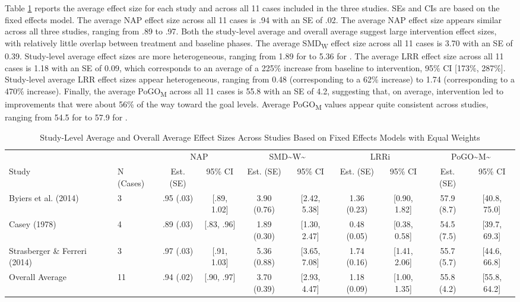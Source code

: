 \documentclass[
]{book}
\begin{document}
Table \ref{tab:FE-study-avg} reports the average effect size for each study and across all 11 cases included in the three studies. SEs and CIs are based on the fixed effects model. The average NAP effect size across all 11 cases is .94 with an SE of .02. The average NAP effect size appears similar across all three studies, ranging from .89 to .97. Both the study-level average and overall average suggest large intervention effect sizes, with relatively little overlap between treatment and baseline phases. The average SMD\textsubscript{W} effect size across all 11 cases is 3.70 with an SE of 0.39. Study-level average effect sizes are more heterogeneous, ranging from 1.89 for \citet{Casey1978} to 5.36 for \citet{StrasbergerFerreri2014}. The average LRR effect size across all 11 cases is 1.18 with an SE of 0.09, which corresponds to an average of a 225\% increase from baseline to intervention, 95\% CI {[}173\%, 287\%{]}. Study-level average LRR effect sizes appear heterogeneous, ranging from 0.48 (corresponding to a 62\% increase) to 1.74 (corresponding to a 470\% increase). Finally, the average PoGO\textsubscript{M} across all 11 cases is 55.8 with an SE of 4.2, suggesting that, on average, intervention led to improvements that were about 56\% of the way toward the goal levels. Average PoGO\textsubscript{M} values appear quite consistent across studies, ranging from 54.5 for \citet{Casey1978} to 57.9 for \citet{Byiers2014}.

\begin{table}

\caption{\label{tab:FE-study-avg}Study-Level Average and Overall Average Effect Sizes Across Studies Based on Fixed Effects Models with Equal Weights}
\centering
\begin{tabular}[t]{l|l|c|c|c|c|c|c|c|c}
\hline
\multicolumn{2}{c|}{ } & \multicolumn{2}{c|}{NAP} & \multicolumn{2}{c|}{SMD\textasciitilde{}W\textasciitilde{}} & \multicolumn{2}{c|}{LRRi} & \multicolumn{2}{c}{PoGO\textasciitilde{}M\textasciitilde{}} \\
\cline{3-4} \cline{5-6} \cline{7-8} \cline{9-10}
Study & N (Cases) & Est. (SE) & 95\% CI & Est. (SE) & 95\% CI & Est. (SE) & 95\% CI & Est. (SE) & 95\% CI\\
\hline
Byiers et al. (2014) & 3 & .95 (.03) & [.89, 1.02] & 3.90 (0.76) & [2.42, 5.38] & 1.36 (0.23) & [0.90, 1.82] & 57.9 (8.7) & [40.8, 75.0]\\
\cline{1-10}
Casey (1978) & 4 & .89 (.03) & [.83, .96] & 1.89 (0.30) & [1.30, 2.47] & 0.48 (0.05) & [0.38, 0.58] & 54.5 (7.5) & [39.7, 69.3]\\
\cline{1-10}
Strasberger \& Ferreri (2014) & 3 & .97 (.03) & [.91, 1.03] & 5.36 (0.88) & [3.65, 7.08] & 1.74 (0.16) & [1.41, 2.06] & 55.7 (5.7) & [44.6, 66.8]\\
\cline{1-10}
Overall Average & 11 & .94 (.02) & [.90, .97] & 3.70 (0.39) & [2.93, 4.47] & 1.18 (0.09) & [1.00, 1.35] & 55.8 (4.2) & [55.8, 64.2]\\
\hline
\end{tabular}
\end{table}
\end{document}

